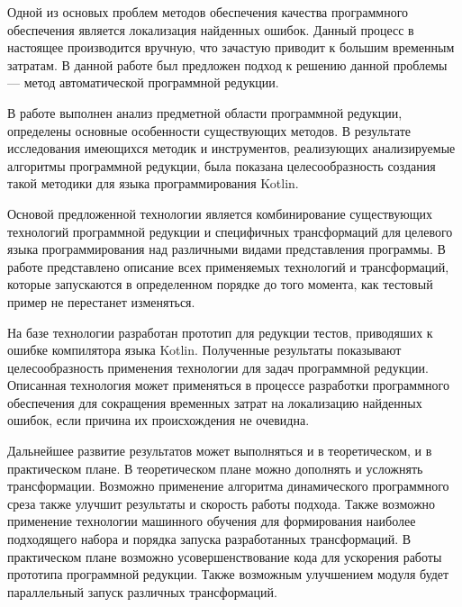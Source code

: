 \conclusion
Одной из основых проблем методов обеспечения качества программного обеспечения является локализация найденных ошибок. Данный процесс в настоящее производится вручную, что зачастую приводит к большим временным затратам. В данной работе был предложен подход к решению данной проблемы --- метод автоматической программной редукции.

В работе выполнен анализ предметной области программной редукции, определены основные особенности существующих методов. В результате исследования имеющихся методик и инструментов, реализующих анализируемые алгоритмы программной редукции, была показана целесообразность создания такой методики для языка программирования Kotlin.

Основой предложенной технологии является комбинирование существующих технологий программной редукции и специфичных трансформаций для целевого языка программирования над различными видами представления программы. В работе представлено описание всех применяемых технологий и трансформаций, которые запускаются в определенном порядке до того момента, как тестовый пример не перестанет изменяться. 

На базе технологии разработан прототип для редукции тестов, приводяших к ошибке компилятора языка Kotlin. Полученные результаты показывают целесообразность применения технологии для задач программной редукции. Описанная технология может применяться в процессе разработки программного обеспечения для сокращения временных затрат на локализацию найденных ошибок, если причина их происхождения не очевидна. 

Дальнейшее развитие результатов может выполняться и в теоретическом, и в практическом плане. В теоретическом плане можно дополнять и усложнять трансформации. Возможно применение алгоритма динамического программного среза также улучшит результаты и скорость работы подхода. Также возможно применение технологии машинного обучения для формирования наиболее подходящего набора и порядка запуска разработанных трансформаций. В практическом плане возможно усовершенствование кода для ускорения работы прототипа программной редукции. Также возможным улучшением модуля будет параллельный запуск различных трансформаций.


